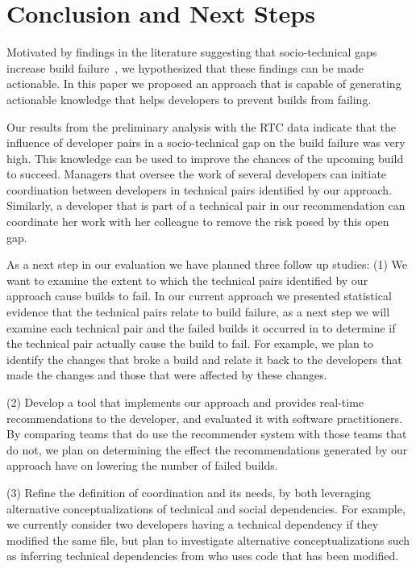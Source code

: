 \documentclass[conference]{IEEEtran}
\begin{document}




\section{Conclusion and Next Steps}
Motivated by findings in the literature suggesting that socio-technical gaps increase build failure~\cite{kwan:tse:2011},
we hypothesized that these findings can be made actionable.
In this paper we proposed an approach that is capable of generating actionable knowledge that helps developers to prevent builds from failing.

Our results from the preliminary analysis with the RTC data indicate that 
the influence of developer pairs in a socio-technical gap on the build
failure was very high.
This knowledge can be used to improve the chances of the upcoming build to succeed.
Managers that oversee the work of several developers can initiate coordination between developers in technical pairs identified by our approach.
Similarly, a developer that is part of a technical pair in our recommendation can coordinate her work with her colleague to remove the risk posed by this open gap.



As a next step in our evaluation we have planned three follow up studies:
(1) We want to examine the extent to which the technical pairs identified by our approach cause builds to fail. 
In our current approach we presented statistical evidence that the technical pairs relate to build failure, as a next step we will examine each technical pair and the failed builds it occurred in to determine if the technical pair actually cause the build to fail.
For example, we plan to identify the changes that broke a build and relate it back to the developers that made the changes and those that were affected by these changes.
%

(2) Develop a tool that implements our approach and provides real-time recommendations to the developer, and evaluated it with software practitioners. By comparing teams that do use the recommender system with those teams that do not, we plan on determining the effect the recommendations generated by our approach have on lowering the number of failed builds.

(3) Refine the definition of coordination and its needs, by both leveraging alternative conceptualizations of technical and social dependencies.
For example, we currently consider two developers having a technical dependency if they modified the same file, but plan to investigate alternative conceptualizations such as inferring technical dependencies from who uses code that has been modified.


\end{document}
